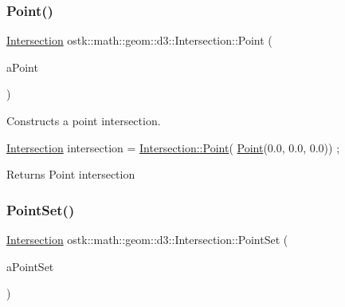 \subsubsection{\texorpdfstring{Point()}{Point()}}
{\footnotesize\ttfamily \hyperlink{classostk_1_1math_1_1geom_1_1d3_1_1_intersection}{Intersection} ostk\+::math\+::geom\+::d3\+::\+Intersection\+::\+Point (\begin{DoxyParamCaption}\item[{const \hyperlink{classostk_1_1math_1_1geom_1_1d3_1_1objects_1_1_point}{objects\+::\+Point} \&}]{a\+Point }\end{DoxyParamCaption})\hspace{0.3cm}{\ttfamily [static]}}



Constructs a point intersection. 


\begin{DoxyCode}
\hyperlink{classostk_1_1math_1_1geom_1_1d3_1_1_intersection_a6091ab689809d0da1e670ca18dffb2d8}{Intersection} intersection = \hyperlink{classostk_1_1math_1_1geom_1_1d3_1_1_intersection_afd86dcb53b13578098048dc5c76a9601}{Intersection::Point}(
      \hyperlink{classostk_1_1math_1_1geom_1_1d3_1_1_intersection_afd86dcb53b13578098048dc5c76a9601}{Point}(0.0, 0.0, 0.0)) ;
\end{DoxyCode}


\begin{DoxyReturn}{Returns}
Point intersection 
\end{DoxyReturn}
\mbox{\label{classostk_1_1math_1_1geom_1_1d3_1_1_intersection_a7304af5d2722d2ab880c728709dc11bb}} 
\subsubsection{\texorpdfstring{Point\+Set()}{PointSet()}}
{\footnotesize\ttfamily \hyperlink{classostk_1_1math_1_1geom_1_1d3_1_1_intersection}{Intersection} ostk\+::math\+::geom\+::d3\+::\+Intersection\+::\+Point\+Set (\begin{DoxyParamCaption}\item[{const \hyperlink{classostk_1_1math_1_1geom_1_1d3_1_1objects_1_1_point_set}{objects\+::\+Point\+Set} \&}]{a\+Point\+Set }\end{DoxyParamCaption})\hspace{0.3cm}{\ttfamily [static]}}



